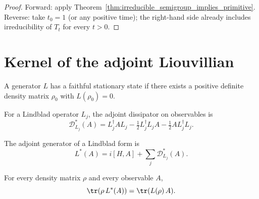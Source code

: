 \begin{proof}\leanok
    Forward: apply Theorem~\ref{thm:irreducible_semigroup_implies_primitive}.
    Reverse: take $t_0 = 1$ (or any positive time); the right-hand side
    already includes irreducibility of $T_t$ for every $t>0$.
\end{proof}

\section{Kernel of the adjoint Liouvillian}
\label{sec:liouvillian_kernel}


\begin{definition}
    \label{def:has_faithful_stationary_state_ch12}
    \leanok
    A generator $L$ has a faithful stationary state if there exists a positive definite
    density matrix $\rho_0$ with $L(\rho_0)=0$.
\end{definition}

\begin{definition}
    \label{def:adjoint_dissipator_ch12}
    \leanok
    For a Lindblad operator $L_j$, the adjoint dissipator on observables is
    \[
        \mathcal{D}_{L_j}^*(A)
        = L_j^\dagger A L_j
        - \tfrac12 L_j^\dagger L_j A
        - \tfrac12 A L_j^\dagger L_j.
    \]
\end{definition}

\begin{definition}
    \label{def:adjoint_generator_ch12}
    \leanok
    The adjoint generator of a Lindblad form is
    \[
        L^*(A) = i[H,A] + \sum_j \mathcal{D}_{L_j}^*(A).
    \]
\end{definition}

\begin{theorem}
    \label{thm:trace_pairing_adjoint_generator_ch12}
    \leanok
    For every density matrix $\rho$ and every observable $A$,
    \[
        \tr(\rho\,L^*(A)) = \tr(L(\rho)\,A).
    \]
\end{theorem}

